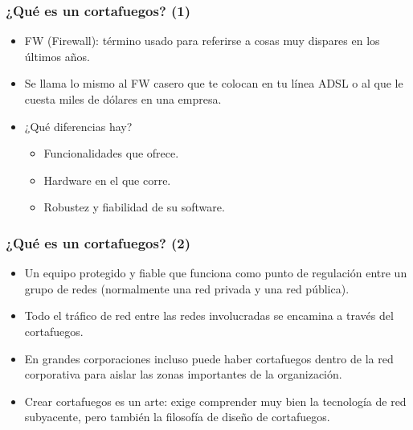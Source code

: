 \documentclass{beamer}
\begin{document}

\begin{frame}
\frametitle{¿Qué es un cortafuegos? (1)}

\begin{itemize}
\item FW (Firewall): término usado para referirse a cosas muy dispares en los últimos años.
\item Se llama lo mismo al FW casero que te colocan en tu línea ADSL o al que le cuesta miles de dólares en una empresa.
\item ¿Qué diferencias hay?

	\begin{itemize}
	\item Funcionalidades que ofrece.
	\item Hardware en el que corre.
	\item Robustez y fiabilidad de su software.
	\end{itemize}

\end{itemize}
\end{frame}


\begin{frame}
\frametitle{¿Qué es un cortafuegos? (2)}

\begin{itemize}
\item Un equipo protegido y fiable que funciona como punto de regulación entre un grupo de redes (normalmente una red privada y una red pública).
\item Todo el tráfico de red entre las redes involucradas se encamina a través del cortafuegos.
\item En grandes corporaciones incluso puede haber cortafuegos dentro de la red corporativa para aislar las zonas importantes de la organización.
\item Crear cortafuegos es un arte: exige comprender muy bien la tecnología de red subyacente, pero también la filosofía de diseño de cortafuegos.
\end{itemize}

\end{frame}



\end{document}
